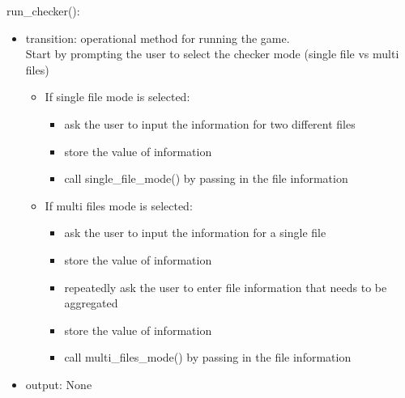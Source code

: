 \documentclass[12pt]{article}
\begin{document}
\noindent run\_checker():
\begin{itemize}
  \item transition: operational method for running the game. \\
  Start by prompting the user to select the checker mode (single file vs multi files)
  \begin{itemize}
    \item If single file mode is selected:
      \begin{itemize}[\null]
        \item ask the user to input the information for two different files
        \item store the value of information 
        \item call single\_file\_mode() by passing in the file information
      \end{itemize}
    \item If multi files mode is selected:
      \begin{itemize}[\null]
        \item ask the user to input the information for a single file
        \item store the value of information 
        \item repeatedly ask the user to enter file information that needs to be aggregated
        \item store the value of information
        \item call multi\_files\_mode() by passing in the file information
      \end{itemize}
  \end{itemize}

  \item output: None
\end{itemize}
\end{document}

